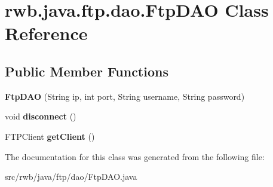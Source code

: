\hypertarget{classrwb_1_1java_1_1ftp_1_1dao_1_1_ftp_d_a_o}{}\section{rwb.\+java.\+ftp.\+dao.\+Ftp\+D\+AO Class Reference}
\label{classrwb_1_1java_1_1ftp_1_1dao_1_1_ftp_d_a_o}
\subsection*{Public Member Functions}
\begin{DoxyCompactItemize}
\item 
\mbox{\label{classrwb_1_1java_1_1ftp_1_1dao_1_1_ftp_d_a_o_ac06de065f470972fd23fcd8cf074b2ea}} 
{\bfseries Ftp\+D\+AO} (String ip, int port, String username, String password)
\item 
\mbox{\label{classrwb_1_1java_1_1ftp_1_1dao_1_1_ftp_d_a_o_ac41be797ba840a90d20cc8a33643ef7f}} 
void {\bfseries disconnect} ()
\item 
\mbox{\label{classrwb_1_1java_1_1ftp_1_1dao_1_1_ftp_d_a_o_a676377f268d69648deb0bf6a5c6e3de9}} 
F\+T\+P\+Client {\bfseries get\+Client} ()
\end{DoxyCompactItemize}


The documentation for this class was generated from the following file\+:\begin{DoxyCompactItemize}
\item 
src/rwb/java/ftp/dao/Ftp\+D\+A\+O.\+java\end{DoxyCompactItemize}
